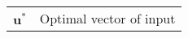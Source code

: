 \begin{scriptsize}
\begin{tabularx}{\textwidth}{r|X}
$\textbf{u}^*$            & Optimal vector of input\\

\end{tabularx}
\end{scriptsize}
